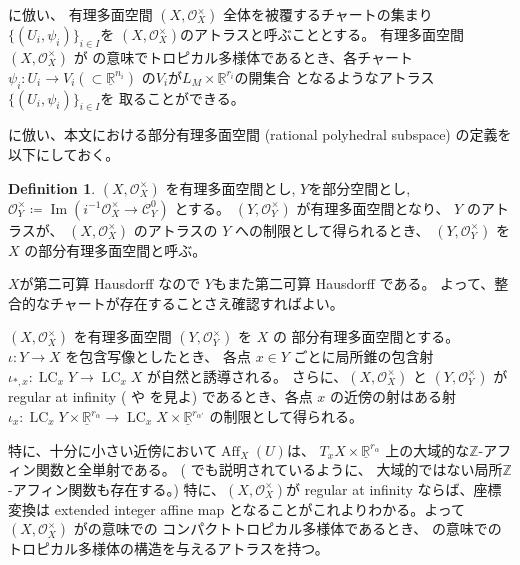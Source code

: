 \documentclass[a4paper,dvipdfmx,reqno,12pt]{amsart}
\theoremstyle{definition}
\newtheorem{definition}[theorem]{Definition}
\newcommand{\deq}{\coloneqq}
\newcommand{\opn}[1]{\operatorname{#1}}
\numberwithin{equation}{section}
\begin{document}
\cite{demedrano2023chern}に倣い、
有理多面空間 $(X,\mathcal{O}_X^{\times})$
全体を被覆するチャートの集まり
$\{(U_i,\psi_i)\}_{i\in I}$を
$(X,\mathcal{O}_X^{\times})$のアトラスと呼ぶこととする。
有理多面空間$(X,\mathcal{O}_X^{\times})$ が
\cite[Definition 6.1]{gross2019sheaftheoretic}
の意味でトロピカル多様体であるとき、各チャート
$\psi_i\colon U_i\to V_i(\subset \underline{\mathbb{R}}^{n_i})$
の$V_i$が$L_M\times \underline{\mathbb{R}}^{r_i}$の開集合
となるようなアトラス$\{(U_i,\psi_i)\}_{i\in I}$を
取ることができる。

\cite[Definition 2.14]{demedrano2023chern}
に倣い、本文における部分有理多面空間
(rational polyhedral subspace)
の定義を以下にしておく。


\begin{definition}

$(X,\mathcal{O}_X^{\times})$ を有理多面空間とし,
$Y$を部分空間とし, 
$\mathcal{O}^{\times}_{Y}\deq 
\opn{Im}(i^{-1}\mathcal{O}_X^{\times}\to \mathcal{C}_{Y}^{0})$
とする。
$(Y,\mathcal{O}_Y^{\times})$ が有理多面空間となり、
$Y$ のアトラスが、
$(X,\mathcal{O}^{\times}_X)$
のアトラスの $Y$ への制限として得られるとき、
$(Y,\mathcal{O}_Y^{\times})$ を
$X$ の部分有理多面空間と呼ぶ。
\end{definition}

$X$が第二可算 Hausdorff なので
$Y$もまた第二可算 Hausdorff である。
よって、整合的なチャートが存在することさえ確認すればよい。

$(X,\mathcal{O}_X^{\times})$ を有理多面空間
$(Y,\mathcal{O}_Y^{\times})$ を $X$ の
部分有理多面空間とする。
$\iota\colon Y \to X$ を包含写像としたとき、
各点 $x\in Y$ ごとに局所錐の包含射
$\iota_{*,x}\colon \opn{LC}_x Y\to \opn{LC}_x X$
が自然と誘導される。
さらに、$(X,\mathcal{O}_X^{\times})$ と
$(Y,\mathcal{O}_Y^{\times})$ が
regular at infinity 
(\cite[]{MR4637248} や
\cite[Definition 1.2]{MR3330789} を見よ) 
であるとき、各点 $x$ の近傍の射はある射
$\iota_{x}\colon \opn{LC}_x Y\times 
\underline{\mathbb{R}}^{r_{\alpha}}
\to \opn{LC}_x X\times \underline{\mathbb{R}}^{r_{\alpha'}}$
の制限として得られる。

特に、十分に小さい近傍において$\opn{Aff}_X(U)$は、
$T_x X\times \underline{\mathbb{R}}^{r_{\alpha}}$
上の大域的な$\mathbb{Z}$-アフィン関数と全単射である。
(\cite[Example 2.1]{MR4637248} でも説明されているように、
大域的ではない局所$\mathbb{Z}$-アフィン関数も存在する。)
特に、$(X,\mathcal{O}_X^{\times})$が regular at infinity
ならば、座標変換は
extended integer affine map \cite[Definition 2.2]{demedrano2023chern}
となることがこれよりわかる。よって
$(X,\mathcal{O}_X^{\times})$ 
が\cite[Definition 6.1]{gross2019sheaftheoretic}の意味での
コンパクトトロピカル多様体であるとき、
\cite[Definition 2.3]{demedrano2023chern}
の意味でのトロピカル多様体の構造を与えるアトラスを持つ。
\end{document}
